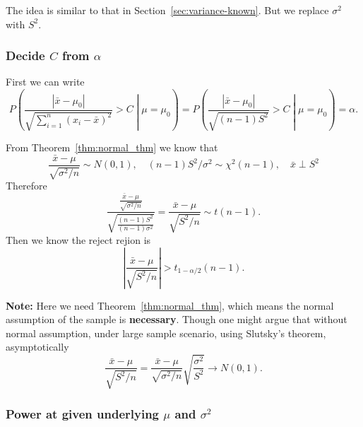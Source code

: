 \documentclass[a4paper,12pt]{article}
\begin{document}
The idea is similar to that in Section~\ref{sec:variance-known}. But we replace $\sigma^2$ with $S^2$.

\subsubsection{Decide $C$ from $\alpha$}
\label{sec:decide-c-from-1}

First we can write
\[
  P\left(
    \frac{\left|\bar{x}-\mu_0\right|}{\sqrt{\sum\limits_{i = 1}^n\left(x_i - \bar{x}\right)^2}} > C
    \middle| \mu = \mu_0
  \right)
  = P\left(
    \frac{\left|\bar{x}-\mu_0\right|}{\sqrt{\left(n - 1\right)S^2}} > C
    \middle| \mu = \mu_0
  \right)
  = \alpha
  .  
\]

From Theorem~\ref{thm:normal_thm} we know that
\[
  \frac{\bar{x} - \mu}{\sqrt{\sigma^2 / n}} \sim N\left(0, 1\right)
  ,\quad
  \left(n - 1\right)S^2 / \sigma^2 \sim \chi^2\left(n - 1\right)
  ,\quad
  \bar{x} \perp S^2
\]
Therefore
\[
  \frac{
    \frac{\bar{x} - \mu}{\sqrt{\sigma^2 / n}}
  }{
    \sqrt{
      \frac{\left(n - 1\right)S^2}{\left(n - 1\right)\sigma^2}
    }
  }
  = \frac{\bar{x} - \mu}{\sqrt{S^2 / n}}
  \sim t(n - 1)
  .
\]
Then we know the reject rejion is
\[
  \left|
    \frac{\bar{x} - \mu}{\sqrt{S^2 / n}}
  \right|
  > t_{1 - \alpha / 2}\left(n - 1\right)
  .
\]

\textbf{Note: } Here we need Theorem~\ref{thm:normal_thm}, which means the normal assumption of the sample is \textbf{necessary}. Though one might argue that without normal assumption, under large sample scenario, using Slutsky's theorem, asymptotically
\[
  \frac{\bar{x} - \mu}{\sqrt{S^2 / n}}
  = \frac{\bar{x} - \mu}{\sqrt{\sigma^2 / n}}
  \sqrt{\frac{\sigma^2}{S^2}}
  \rightarrow N\left(0, 1\right)
  .
\]

\subsubsection{Power at given underlying $\mu$ and $\sigma^2$}
\label{sec:power-at-given-1}
\end{document}
